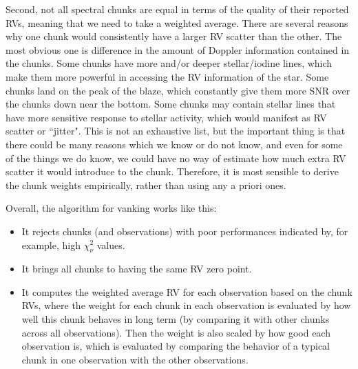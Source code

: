 Second, not all spectral chunks are equal in terms of the quality of
their reported RVs, meaning that we need to take a weighted
average. There are several reasons why one chunk would consistently
have a larger RV scatter than the other. The most obvious one is
difference in the amount of Doppler information contained in the
chunks. Some chunks have more and/or deeper stellar/iodine lines,
which make them more powerful in accessing the RV information of the
star. Some chunks land on the peak of the blaze, which constantly give
them more SNR over the chunks down near the bottom. Some chunks may
contain stellar lines that have more sensitive response to stellar
activity, which would manifest as RV scatter or ``jitter". This is not
an exhaustive list, but the important thing is that there could be
many reasons which we know or do not know, and even for some of the
things we do know, we could have no way of estimate how much extra RV
scatter it would introduce to the chunk. Therefore, it is most
sensible to derive the chunk weights empirically, rather than using
any a priori ones.

Overall, the algorithm for vanking works like this:
\begin{itemize}
\item It rejects chunks (and observations) with poor performances
  indicated by, for example, high $\chi^2_\nu$ values.
\item It brings all chunks to having the same RV zero point.  
\item It computes the weighted average RV for each observation based
  on the chunk RVs, where the weight for each chunk in each
  observation is evaluated by how well this chunk behaves in long term
  (by comparing it with other chunks across all observations).
  Then the weight is also scaled by how good each observation is,
  which is evaluated by comparing the behavior of a typical chunk in
  one observation with the other observations.
\end{itemize} 

